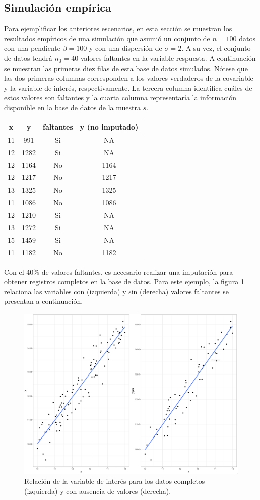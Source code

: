 \documentclass[
  12pt,
  spanish,
]{book}
\begin{document}
\hypertarget{simulaciuxf3n-empuxedrica}{%
\subsection{Simulación empírica}\label{simulaciuxf3n-empuxedrica}}

Para ejemplificar los anteriores escenarios, en esta sección se muestran los resultados empíricos de una simulación que asumió un conjunto de \(n = 100\) datos con una pendiente \(\beta = 100\) y con una dispersión de \(\sigma = 2\). A su vez, el conjunto de datos tendrá \(n_0 = 40\) valores faltantes en la variable respuesta. A continuación se muestran las primeras diez filas de esta base de datos simulados. Nótese que las dos primeras columnas corresponden a los valores verdaderos de la covariable y la variable de interés, respectivamente. La tercera columna identifica cuáles de estos valores son faltantes y la cuarta columna representaría la información disponible en la base de datos de la muestra \(s\).

\begin{longtable}[]{@{}cccc@{}}
\toprule
x & y & faltantes & y (no imputado) \\
\midrule
\endhead
11 & 991 & Si & NA \\
12 & 1282 & Si & NA \\
12 & 1164 & No & 1164 \\
12 & 1217 & No & 1217 \\
13 & 1325 & No & 1325 \\
11 & 1086 & No & 1086 \\
12 & 1210 & Si & NA \\
13 & 1272 & Si & NA \\
15 & 1459 & Si & NA \\
11 & 1182 & No & 1182 \\
\bottomrule
\end{longtable}

Con el 40\% de valores faltantes, es necesario realizar una imputación para obtener registros completos en la base de datos. Para este ejemplo, la figura \ref{fig:figim1} relaciona las variables con (izquierda) y sin (derecha) valores faltantes se presentan a continuación.

\begin{figure}
\includegraphics[width=0.5\linewidth]{Pics/im1} \caption{Relación de la variable de interés para los datos completos (izquierda) y con ausencia de valores (derecha).}\label{fig:figim1}
\end{figure}
\end{document}
